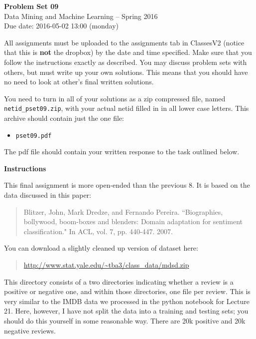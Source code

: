 \documentclass[12pt]{article}
\begin{document}
\begin{center}
{\bf Problem Set 09} \\
Data Mining and Machine Learning -- Spring 2016 \\
Due date: 2016-05-02 13:00 (monday)
\end{center}

\medskip

All assignments must be uploaded to the assignments tab in ClassesV2
(notice that this is \textbf{not} the dropbox) by the date and time specified.
Make sure that you follow the instructions exactly as described.
You may discuss problem sets with others, but must write up your own
solutions. This means that you should have no need to look at other's
final written solutions.

You need to turn in all of your solutions as a zip compressed file, named
\texttt{netid\_pset09.zip}, with your actual netid filled in in all lower
case letters. This archive should contain just the one file:
\begin{itemize}
\item \texttt{pset09.pdf}
\end{itemize}
The pdf file should contain your written response to the task outlined below.

\medskip

\textbf{Instructions}

This final assignment is more open-ended than the previous 8. It is based on the
data discussed in this paper:
\begin{quote}
Blitzer, John, Mark Dredze, and Fernando Pereira. ``Biographies, bollywood,
boom-boxes and blenders: Domain adaptation for sentiment classification."
In ACL, vol. 7, pp. 440-447. 2007.
\end{quote}
You can download a slightly cleaned up version of dataset here:
\begin{quote}
\url{http://www.stat.yale.edu/~tba3/class_data/mdsd.zip}
\end{quote}
This directory consists of a two directories indicating whether a review is
a positive or negative one, and within those directories, one file per review.
This is very similar to the IMDB data we processed in
the python notebook for Lecture 21. Here, however, I have not split the data into
a training and testing sets; you should do this yourself in some reasonable way.
There are 20k positive and 20k negative reviews.
\end{document}
